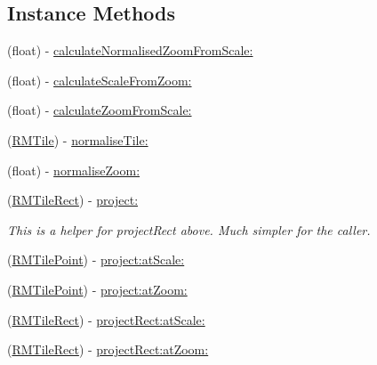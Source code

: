 \subsection*{Instance Methods}
\begin{DoxyCompactItemize}
\item 
(float) -\/ \hyperlink{protocol_r_m_mercator_to_tile_projection-p_a470b0ea952dd174bbd573bdfb230cc6e}{calculate\-Normalised\-Zoom\-From\-Scale\-:}
\item 
(float) -\/ \hyperlink{protocol_r_m_mercator_to_tile_projection-p_a49c836acfac1908808c5f218f3bc64a4}{calculate\-Scale\-From\-Zoom\-:}
\item 
(float) -\/ \hyperlink{protocol_r_m_mercator_to_tile_projection-p_a013a65cf254c34e3ec021864a4fb8f53}{calculate\-Zoom\-From\-Scale\-:}
\item 
(\hyperlink{struct_r_m_tile}{R\-M\-Tile}) -\/ \hyperlink{protocol_r_m_mercator_to_tile_projection-p_ac8776965edc17be3e90c03aad46a8371}{normalise\-Tile\-:}
\item 
(float) -\/ \hyperlink{protocol_r_m_mercator_to_tile_projection-p_a48d47f3689db59a82bde9da209529f9b}{normalise\-Zoom\-:}
\item 
(\hyperlink{struct_r_m_tile_rect}{R\-M\-Tile\-Rect}) -\/ \hyperlink{protocol_r_m_mercator_to_tile_projection-p_ae80633ea6d0b4e354666ec6e7ddd88af}{project\-:}
\begin{DoxyCompactList}\small\item\em This is a helper for project\-Rect above. Much simpler for the caller. \end{DoxyCompactList}\item 
(\hyperlink{struct_r_m_tile_point}{R\-M\-Tile\-Point}) -\/ \hyperlink{protocol_r_m_mercator_to_tile_projection-p_aac47d8222bec29f9d8469d166510b9cd}{project\-:at\-Scale\-:}
\item 
(\hyperlink{struct_r_m_tile_point}{R\-M\-Tile\-Point}) -\/ \hyperlink{protocol_r_m_mercator_to_tile_projection-p_a0351c94bf59dfc97b5c1c712a5b2f3b2}{project\-:at\-Zoom\-:}
\item 
(\hyperlink{struct_r_m_tile_rect}{R\-M\-Tile\-Rect}) -\/ \hyperlink{protocol_r_m_mercator_to_tile_projection-p_a6d26aef35f64a793066fdf8c4e3cda10}{project\-Rect\-:at\-Scale\-:}
\item 
(\hyperlink{struct_r_m_tile_rect}{R\-M\-Tile\-Rect}) -\/ \hyperlink{protocol_r_m_mercator_to_tile_projection-p_a53c5b90994528d20a3d85307244ac412}{project\-Rect\-:at\-Zoom\-:}
\end{DoxyCompactItemize}
